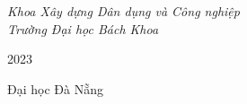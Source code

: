 \documentclass[12pt,a4paper,twoside,openright]{book}
\theoremstyle{definition}
\begin{document}
\begin{titlepage}
	\textit{Khoa Xây dựng Dân dụng và Công nghiệp \\ Trường Đại học Bách Khoa} %
	
	\vfill %
	
	
	
	\vspace{0.3\baselineskip} %
	
	2023 %
	
	{\large Đại học Đà Nẵng} %

\end{titlepage}



\tableofcontents

\pagestyle{fancy}

\renewcommand{\headrulewidth}{2pt}
\renewcommand{\footrulewidth}{0pt}





%


%
%
%
%
%

\appendix




\clearpage %
{}


%


\printindex
\end{document}
